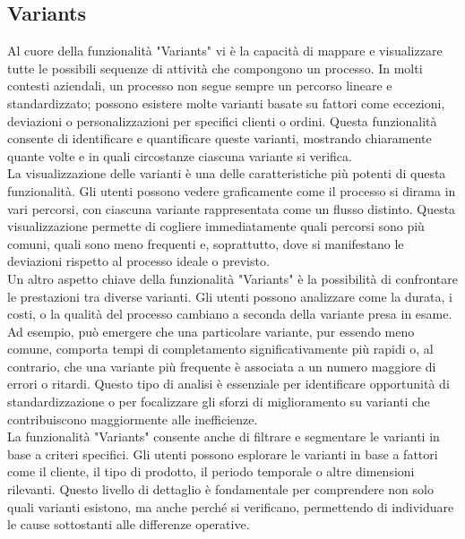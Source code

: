 \documentclass{article}
\begin{document}
\subsection{Variants}
Al cuore della funzionalità "Variants" vi è la capacità di mappare e visualizzare tutte le possibili sequenze di attività che compongono un processo. In molti contesti aziendali, un processo non segue sempre un percorso lineare e standardizzato; possono esistere molte varianti basate su fattori come eccezioni, deviazioni o personalizzazioni per specifici clienti o ordini. Questa funzionalità consente di identificare e quantificare queste varianti, mostrando chiaramente quante volte e in quali circostanze ciascuna variante si verifica.\\
La visualizzazione delle varianti è una delle caratteristiche più potenti di questa funzionalità. Gli utenti possono vedere graficamente come il processo si dirama in vari percorsi, con ciascuna variante rappresentata come un flusso distinto. Questa visualizzazione permette di cogliere immediatamente quali percorsi sono più comuni, quali sono meno frequenti e, soprattutto, dove si manifestano le deviazioni rispetto al processo ideale o previsto.\\
Un altro aspetto chiave della funzionalità "Variants" è la possibilità di confrontare le prestazioni tra diverse varianti. Gli utenti possono analizzare come la durata, i costi, o la qualità del processo cambiano a seconda della variante presa in esame. Ad esempio, può emergere che una particolare variante, pur essendo meno comune, comporta tempi di completamento significativamente più rapidi o, al contrario, che una variante più frequente è associata a un numero maggiore di errori o ritardi. Questo tipo di analisi è essenziale per identificare opportunità di standardizzazione o per focalizzare gli sforzi di miglioramento su varianti che contribuiscono maggiormente alle inefficienze.\\
La funzionalità "Variants" consente anche di filtrare e segmentare le varianti in base a criteri specifici. Gli utenti possono esplorare le varianti in base a fattori come il cliente, il tipo di prodotto, il periodo temporale o altre dimensioni rilevanti. Questo livello di dettaglio è fondamentale per comprendere non solo quali varianti esistono, ma anche perché si verificano, permettendo di individuare le cause sottostanti alle differenze operative.
\end{document}
